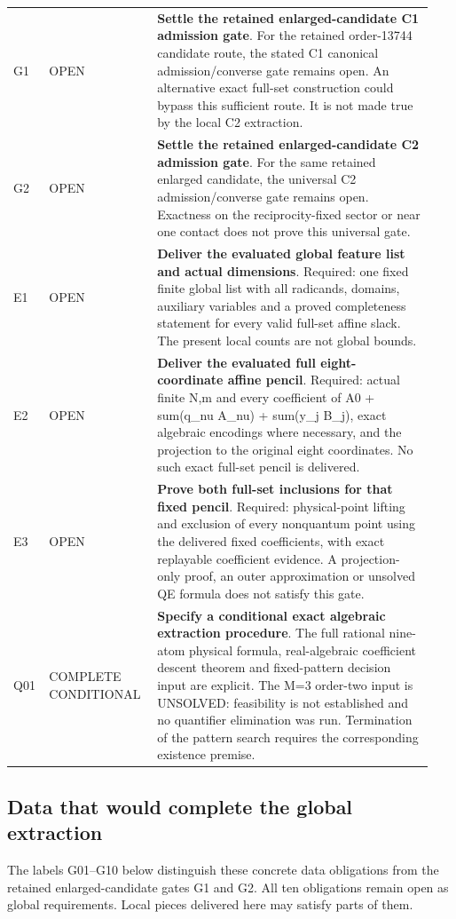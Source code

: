 \begin{longtable}{@{}>{\raggedright\arraybackslash}p{0.075\linewidth}>{\raggedright\arraybackslash}p{0.235\linewidth}>{\raggedright\arraybackslash}p{0.63\linewidth}@{}}
G1 & OPEN & \textbf{Settle the retained enlarged-candidate C1 admission gate}. For the retained order-13744 candidate route, the stated C1 canonical admission/converse gate remains open. An alternative exact full-set construction could bypass this sufficient route. It is not made true by the local C2 extraction.\\[5pt]
G2 & OPEN & \textbf{Settle the retained enlarged-candidate C2 admission gate}. For the same retained enlarged candidate, the universal C2 admission/converse gate remains open. Exactness on the reciprocity-fixed sector or near one contact does not prove this universal gate.\\[5pt]
E1 & OPEN & \textbf{Deliver the evaluated global feature list and actual dimensions}. Required: one fixed finite global list with all radicands, domains, auxiliary variables and a proved completeness statement for every valid full-set affine slack. The present local counts are not global bounds.\\[5pt]
E2 & OPEN & \textbf{Deliver the evaluated full eight-coordinate affine pencil}. Required: actual finite N,m and every coefficient of A0 + sum(q\_nu A\_nu) + sum(y\_j B\_j), exact algebraic encodings where necessary, and the projection to the original eight coordinates. No such exact full-set pencil is delivered.\\[5pt]
E3 & OPEN & \textbf{Prove both full-set inclusions for that fixed pencil}. Required: physical-point lifting and exclusion of every nonquantum point using the delivered fixed coefficients, with exact replayable coefficient evidence. A projection-only proof, an outer approximation or unsolved QE formula does not satisfy this gate.\\[5pt]
Q01 & COMPLETE CONDITIONAL & \textbf{Specify a conditional exact algebraic extraction procedure}. The full rational nine-atom physical formula, real-algebraic coefficient descent theorem and fixed-pattern decision input are explicit. The M=3 order-two input is UNSOLVED: feasibility is not established and no quantifier elimination was run. Termination of the pattern search requires the corresponding existence premise.\\[5pt]
\bottomrule
\end{longtable}
\normalsize
\subsection{Data that would complete the global extraction}
The labels G01--G10 below distinguish these concrete data obligations from the retained enlarged-candidate gates G1 and G2. All ten obligations remain open as global requirements. Local pieces delivered here may satisfy parts of them.
